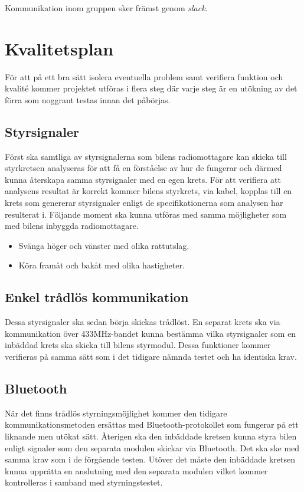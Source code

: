 \documentclass[a4paper]{article}
\begin{document}
\vspace{5mm}
\noindent Kommunikation inom gruppen sker främst genom {\it slack}.


\section{Kvalitetsplan}
För att på ett bra sätt isolera eventuella problem samt verifiera funktion och kvalité kommer projektet utföras i flera steg där varje steg är en utökning av det förra som noggrant testas innan det påbörjas. 

\subsection{Styrsignaler}
Först ska samtliga av styrsignalerna som bilens radiomottagare kan skicka till styrkretsen analyseras för att få en förståelse av hur de fungerar och därmed kunna återskapa samma styrsignaler med en egen krets. För att verifiera att analysens resultat är korrekt kommer bilens styrkrets, via kabel, kopplas till en krets som genererar styrsignaler enligt de specifikationerna som analysen har resulterat i. Följande moment ska kunna utföras med samma möjligheter som med bilens inbyggda radiomottagare.
\begin{itemize}  
    \item Svänga höger och vänster med olika rattutslag.
    \item Köra framåt och bakåt med olika hastigheter.
\end{itemize}

\subsection{Enkel trådlös kommunikation}
Dessa styrsignaler ska sedan börja skickas trådlöst. En separat krets ska via kommunikation över 433MHz-bandet kunna bestämma vilka styrsignaler som en inbäddad krets ska skicka till bilens styrmodul. Dessa funktioner kommer verifieras på samma sätt som i det tidigare nämnda testet och ha identiska krav.  

\subsection{Bluetooth}
När det finns trådlös styrningsmöjlighet kommer den tidigare kommunikationsmetoden ersättas med Bluetooth-protokollet som fungerar på ett liknande men utökat sätt. Återigen ska den inbäddade kretsen kunna styra bilen enligt signaler som den separata modulen skickar via Bluetooth. Det ska ske med samma krav som i de förgående testen. Utöver det måste den inbäddade kretsen kunna upprätta en anslutning med den separata modulen vilket kommer kontrolleras i samband med styrningstestet.
\end{document}
